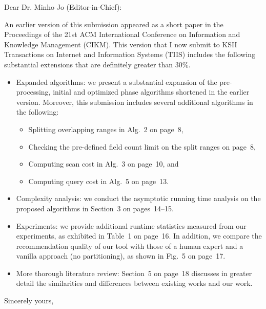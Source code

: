 \documentclass{letter} %
\begin{document}
\begin{letter}
 
\opening{Dear Dr. Minho Jo (Editor-in-Chief):} 
 
\noindent An earlier version of this submission appeared as a short paper in the Proceedings of the 21st ACM \hbox{International} Conference on Information and Knowledge Management (CIKM). 
This version that I now submit to KSII Transactions on Internet and Information Systems (TIIS) includes the following substantial extensions that are definitely greater than 30\%.

\begin{itemize}

\item Expanded algorithms: we present a substantial expansion of the pre-processing, initial and optimized phase algorithms shortened in the earlier version. Moreover, this submission includes 
several additional algorithms in the following:

\begin{itemize}

\item Splitting overlapping ranges in {\color{blue}Alg.~2} on page~8,
\item Checking the pre-defined field count limit on the split ranges on page~8,
\item Computing scan cost in {\color{blue}Alg.~3} on page~10, and
\item Computing query cost in {\color{blue}Alg.~5} on page~13.

\end{itemize} 
 
\item Complexity analysis: we conduct the asymptotic running time analysis on the proposed algorithms in Section~3 on pages~14--15.

\item Experiments: we provide additional runtime statistics measured from our experiments, as exhibited in {\color{blue}Table~1} on page~16. In addition, we compare the recommendation quality of our tool with those of a human expert and a vanilla approach (no partitioning), as shown in {\color{blue}Fig.~5} on page~17.

\item More thorough literature review: Section~5 on page~18 discusses in greater detail the similarities and differences between existing works and our work.

\end{itemize} 
 
\closing{Sincerely yours,} 

\end{letter}
 
\end{document}
